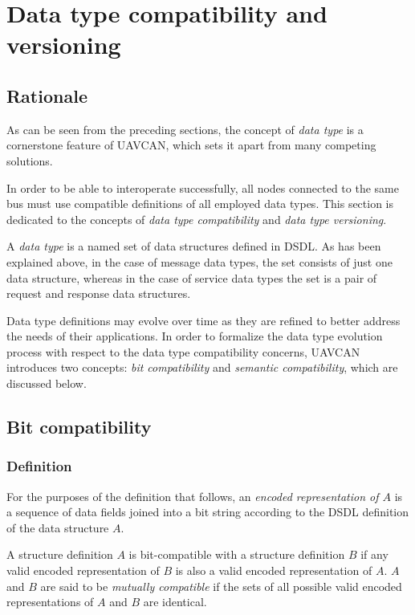 \section{Data type compatibility and versioning}\label{sec:dsdl_versioning}

\subsection{Rationale}

As can be seen from the preceding sections,
the concept of \emph{data type} is a cornerstone feature of UAVCAN,
which sets it apart from many competing solutions.

In order to be able to interoperate successfully,
all nodes connected to the same bus must use compatible definitions of all employed data types.
This section is dedicated to the concepts of \emph{data type compatibility}
and \emph{data type versioning}.

A \emph{data type} is a named set of data structures defined in DSDL.
As has been explained above, in the case of message data types,
the set consists of just one data structure, whereas in the case of service data types
the set is a pair of request and response data structures.

Data type definitions may evolve over time as they are refined to better address the needs of their applications.
In order to formalize the data type evolution process with respect to the data type compatibility concerns,
UAVCAN introduces two concepts: \emph{bit compatibility} and \emph{semantic compatibility},
which are discussed below.

\subsection{Bit compatibility}

\subsubsection{Definition}

For the purposes of the definition that follows, an \emph{encoded representation of $A$}
is a sequence of data fields joined into a bit string according to the DSDL definition
of the data structure $A$.

A structure definition $A$ is bit-compatible with a structure definition $B$
if any valid encoded representation of $B$ is also a valid encoded representation of $A$.
$A$ and $B$ are said to be \emph{mutually compatible} if the sets of all possible valid encoded representations of
$A$ and $B$ are identical.

